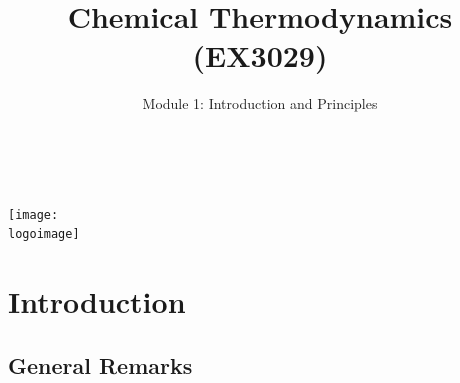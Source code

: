 \documentclass[10pt,compress]{beamer}
\institute{School of Engineering}
\title{Chemical Thermodynamics (EX3029)}
\subtitle{Module 1: Introduction and Principles}
\date[ ]{ }
\author[\shortname]{%
  \fullname\\\ttfamily{\emailaddress}
}
\newcommand{\logoimage}{../FigBanner/UoAHorizBanner}
\begin{document}
\begin{frame}
  \titlepage
  \vfill%
  \begin{center}
    \texttt{[image: \\logoimage]}
  \end{center}
\end{frame}




\section{Introduction} 

\subsection{General Remarks} 
\end{document}
